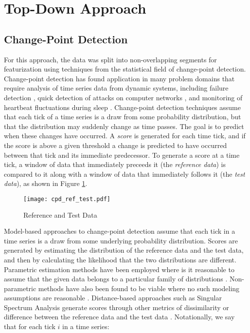 
\section{Top-Down Approach}
\label{sec:topdown}

\subsection{Change-Point Detection}
For this approach, the data was split into non-overlapping segments for
featurization using techniques from the statistical field of change-point
detection. Change-point detection has found application in many problem domains
that require analysis of time series data from dynamic systems, including
failure detection \cite{bae13}, quick detection of attacks on computer networks
\cite{tartakovsky06}, and monitoring of heartbeat fluctuations during
sleep \cite{staudacher05}. Change-point detection techniques assume that each
tick of a time series is a draw from some probability
distribution, but that the distribution may suddenly change as time passes.
The goal is to predict when these changes have occurred.
A \emph{score} is generated for each time tick, and if the score is
above a given threshold a change is predicted to have occurred between that tick
and its immediate predecessor. To generate a score at a time tick, a window of
data that immediately preceeds it (the \emph{reference data}) is compared to it
along with a window of data that immediately follows it (the \emph{test data}), 
as shown in Figure \ref{fig:cpd_ref_test}.

\begin{figure}
 \centering
 \texttt{[image: cpd\_ref\_test.pdf]}
 \caption{Reference and Test Data}
 \label{fig:cpd_ref_test}
\end{figure}

Model-based approaches to change-point detection assume that each tick in
a time series is a draw from some underlying probability distribution.
Scores are generated by estimating the distribution of the reference data
and the test data, and then by calculating the likelihood
that the two distributions are different. Parametric estimation methods have
been employed where is it reasonable to assume that the given data belongs to a
particular family of distributions \cite{thatte11}. Non-parametric methods have
also been found to be viable where no such modeling
assumptions are reasonable \cite{metteson12}. Distance-based approaches such as
Singular Spectrum Analysis generate scores through other metrics of 
dissimilarity or difference between the reference data and the test data
\cite{moskvina03}.
Notationally, we say that for each tick $i$ in a time series:

